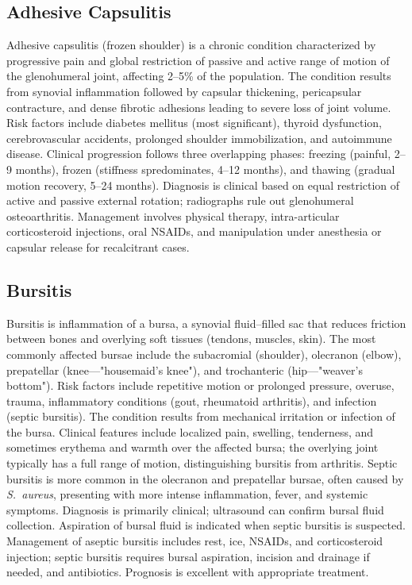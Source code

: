 \subsection{Adhesive Capsulitis}
\label{sec:Adhesive Capsulitis}
Adhesive capsulitis (frozen shoulder) is a chronic condition characterized by progressive pain and global restriction of passive and active range of motion of the glenohumeral joint, affecting 2--5\% of the population. The condition results from synovial inflammation followed by capsular thickening, pericapsular contracture, and dense fibrotic adhesions leading to severe loss of joint volume. Risk factors include diabetes mellitus (most significant), thyroid dysfunction, cerebrovascular accidents, prolonged shoulder immobilization, and autoimmune disease. Clinical progression follows three overlapping phases: freezing (painful, 2--9 months), frozen (stiffness spredominates, 4--12 months), and thawing (gradual motion recovery, 5--24 months). Diagnosis is clinical based on equal restriction of active and passive external rotation; radiographs rule out glenohumeral osteoarthritis. Management involves physical therapy, intra-articular corticosteroid injections, oral NSAIDs, and manipulation under anesthesia or capsular release for recalcitrant cases.

\subsection{Bursitis}
\label{sec:Bursitis}
Bursitis is inflammation of a bursa, a synovial fluid--filled sac that reduces friction between bones and overlying soft tissues (tendons, muscles, skin). The most commonly affected bursae include the subacromial (shoulder), olecranon (elbow), prepatellar (knee---"housemaid's knee"), and trochanteric (hip---"weaver's bottom"). Risk factors include repetitive motion or prolonged pressure, overuse, trauma, inflammatory conditions (gout, rheumatoid arthritis), and infection (septic bursitis). The condition results from mechanical irritation or infection of the bursa. Clinical features include localized pain, swelling, tenderness, and sometimes erythema and warmth over the affected bursa; the overlying joint typically has a full range of motion, distinguishing bursitis from arthritis. Septic bursitis is more common in the olecranon and prepatellar bursae, often caused by \textit{S.~aureus}, presenting with more intense inflammation, fever, and systemic symptoms. Diagnosis is primarily clinical; ultrasound can confirm bursal fluid collection. Aspiration of bursal fluid is indicated when septic bursitis is suspected. Management of aseptic bursitis includes rest, ice, NSAIDs, and corticosteroid injection; septic bursitis requires bursal aspiration, incision and drainage if needed, and antibiotics. Prognosis is excellent with appropriate treatment.

